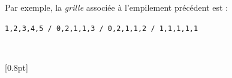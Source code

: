 \documentclass[french,a4paper,11pt]{article}
\begin{document}
\begin{importantblock}
Par exemple, la \textit{grille} associée à l'empilement précédent est :

\smallskip

\hfill\texttt{1,2,3,4,5 / 0,2,1,1,3 / 0,2,1,1,2 / 1,1,1,1,1}\hfill~
\end{importantblock}

\vfill~

\begin{PresCode}{}
\begin{EmpilementCubes}
\end{EmpilementCubes}
\end{PresCode}

\begin{PresCode}{}
\end{PresCode}

\begin{PresCode}{}
\begin{EmpilementCubes}[2]
	[0.8pt]
\end{EmpilementCubes}
\end{PresCode}
\end{document}
